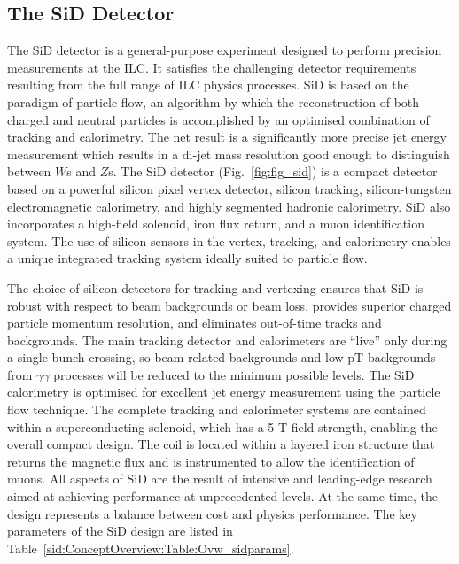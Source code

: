 \subsection{The SiD Detector}
The SiD detector is a general-purpose experiment designed to perform
 precision measurements
at the ILC. It satisfies the challenging detector requirements resulting from the full range of ILC physics processes. SiD is based on the paradigm of particle flow, an algorithm by which
the reconstruction of both charged and neutral particles is accomplished by an optimised
combination of tracking and calorimetry. The net result is a significantly more precise jet
energy measurement which results in a di-jet mass resolution good enough to distinguish
between $W$s and $Z$s.
The SiD detector (Fig.~\ref{fig:fig_sid})  is a compact detector based on a powerful silicon
pixel vertex detector, silicon tracking, silicon-tungsten electromagnetic calorimetry, and
highly segmented hadronic calorimetry. 
SiD also incorporates a high-field solenoid, iron
flux return, and a muon identification system. The use of silicon 
sensors in the vertex, tracking,
and calorimetry enables a unique integrated tracking system ideally suited to particle
flow.

The choice of silicon detectors for tracking and vertexing ensures that SiD is robust
with respect to beam backgrounds or beam loss, provides superior charged particle momentum
resolution, and eliminates out-of-time tracks and backgrounds. The main tracking
detector and calorimeters are “live” only during a single bunch crossing, so beam-related
backgrounds and low-pT backgrounds from $\gamma\gamma$ processes will be reduced to the minimum
possible levels. The SiD calorimetry is optimised for excellent jet energy measurement
using the particle flow technique.
 The complete tracking and calorimeter systems are contained
within a superconducting solenoid, which has a 5 T field strength, enabling the overall
compact design. The coil is located within a layered iron structure
that returns the magnetic flux and is instrumented to allow the
identification of muons. 
All aspects of SiD are the result of intensive and leading-edge research aimed at achieving
performance at unprecedented levels. At the same time, the design represents a balance between cost
and physics performance. The key parameters of the SiD design are
listed in  
Table~\ref{sid:ConceptOverview:Table:Ovw_sidparams}.

